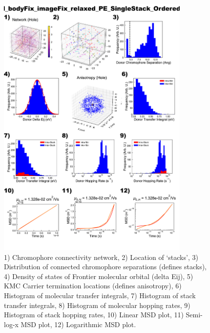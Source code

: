 \documentclass[12pt]{article}
\begin{document}
\begin{figure}[h]\centering
	\includegraphics[width=0.85\textwidth]{Figures/VRH_bodyFix_imageFix_relaxed_PE_SingleStack_Ordered_AA.png}
    \caption{   1) Chromophore connectivity network, 
                2) Location of `stacks', 
                3) Distribution of connected chromophore separations (defines stacks),
                4) Density of states of Frontier molecular orbital (delta Eij),
                5) KMC Carrier termination locations (defines anisotropy),
                6) Histogram of molecular transfer integrals,
                7) Histogram of stack transfer integrals,
                8) Histogram of molecular hopping rates,
                9) Histogram of stack hopping rates,
                10) Linear MSD plot,
                11) Semi-log-x MSD plot,
                12) Logarithmic MSD plot.}
	\label{fig:VRHPESingOrd}
\end{figure}
\end{document}
